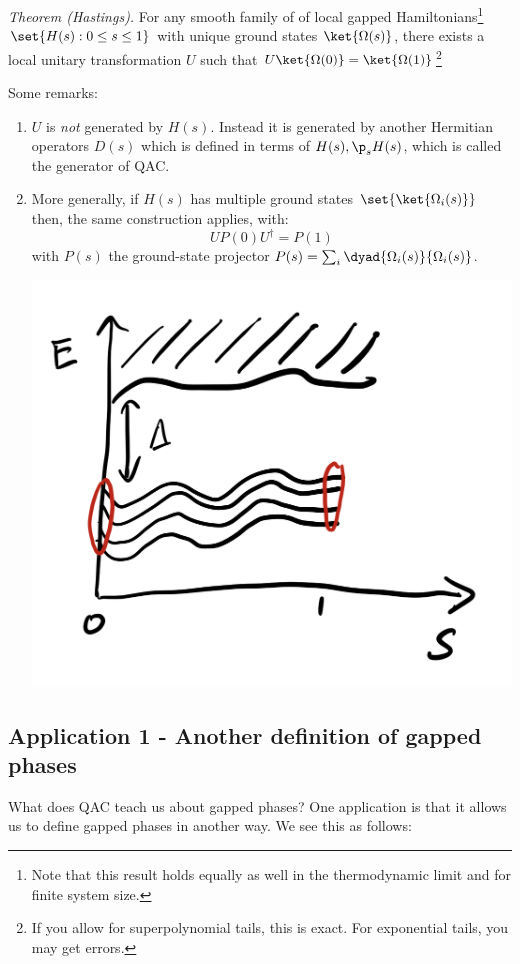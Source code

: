 \textit{Theorem (Hastings).} For any smooth family of of local gapped Hamiltonians\footnote{Note that this result holds equally as well in the thermodynamic limit and for finite system size.} $\set{H(s): 0 \leq s \leq 1}$ with unique ground states $\ket{\Omega(s)}$, there exists a local unitary transformation $U$ such that $U\ket{\Omega(0)} = \ket{\Omega(1)}$\footnote{If you allow for superpolynomial tails, this is exact. For exponential tails, you may get errors.}

Some remarks:
\begin{enumerate}
    \item $U$ is \emph{not} generated by $H(s)$. Instead it is generated by another Hermitian operators $D(s)$ which is defined in terms of $H(s), \p_sH(s)$, which is called the generator of QAC.
    \item More generally, if $H(s)$ has multiple ground states $\set{\ket{\Omega_i(s)}}$ then, the same construction applies, with:
    \begin{equation}
        UP(0)U^\dag = P(1)
    \end{equation}
    with $P(s)$ the ground-state projector $P(s) = \sum_i \dyad{\Omega_i(s)}{\Omega_i(s)}$.
    \begin{center}
        \includegraphics[scale=0.35]{Lectures/Images/lec12-preservinggroundspace.png}
    \end{center}
\end{enumerate}

\subsection{Application 1 - Another definition of gapped phases}
What does QAC teach us about gapped phases? One application is that it allows us to define gapped phases in another way. We see this as follows:


